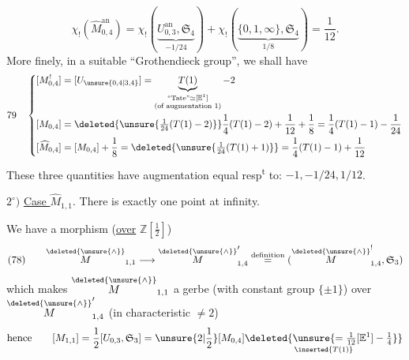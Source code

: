 \[
\chi_!(\widehat M^{\mathrm{an}}_{0,4})=\chi_!(\underbrace{U^{\mathrm{an}}_{0,3},\mathfrak S_4}_{-1/24})+\chi_!(\underbrace{\{0,1,\infty\},\mathfrak S_4}_{1/8})=\frac1{12}.
\]
More finely, in a suitable ``Grothendieck group'', we shall have
\[
79\quad\left\{\begin{aligned}
[M^!_{0,4}]&=[U_{\unsure{0,4|3,4}}]=\underbrace{T(1)}_{\substack{\text{``Tate''}\simeq[\mathbb E^1]\\(\text{of augmentation }1)}}-2\\
[M_{0,4}]&=\deleted{\unsure{\tfrac1{24}(T(1)-2)}}\frac14(T(1)-2)+\frac1{12}+\frac18=\frac14(T(1)-1)-\frac1{24}\\
[\widehat M_{0,4}]&=[M_{0,4}]+\frac18=\deleted{\unsure{\tfrac1{24}(T(1)+1)}}=\frac14(T(1)-1)+\frac1{12}
\end{aligned}\right.
\]
These three quantities have augmentation equal resp\textsuperscript{t} to: $-1,-1/24,1/12$.

$2^\circ)$ \uline{Case } $\widehat M_{1,1}$.
There is exactly one point at infinity.

We have a morphism (\uline{over} $\mathbb Z[\frac12]$)
\[
(78)\qquad \overset{\deleted{\unsure{\wedge}}}{M}_{1,1}\longrightarrow\overset{\deleted{\unsure{\wedge}}}{M}'_{1,4}\overset{\mathrm{definition}}{=}(\overset{\deleted{\unsure{\wedge}}}{M}^!_{1,4},\mathfrak S_3)
\]
which makes $\overset{\deleted{\unsure{\wedge}}}{M}_{1,1}$ a gerbe (with constant group $\{\pm1\}$) over $\overset{\deleted{\unsure{\wedge}}}{M}'_{1,4}$ (in characteristic $\neq2$)
\[
\text{hence}\qquad [M_{1,1}]=\frac12[U_{0,3},\mathfrak S_3]=\unsure{2|\frac12}[M_{0,4}]\underset{\inserted{T(1)}}{\deleted{\unsure{=\tfrac1{12}[\mathbb E^1]-\tfrac14}}}
\]
